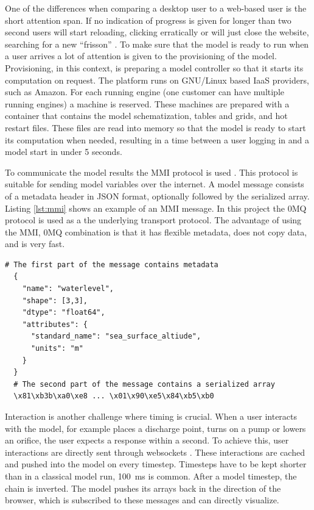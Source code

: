 \documentclass[a4paper]{article}
\begin{document}
One of the differences when comparing a desktop user to a web-based user is the short attention span. If no indication of progress is given for longer than two second users will start reloading, clicking erratically or will just close the website, searching for a new ``frisson'' \citep{Carr2011}. To make sure that the model is ready to run when a user arrives a lot of attention is given to the provisioning of the model. Provisioning, in this context, is preparing a model controller so that it starts its computation on request. The platform runs on GNU/Linux based \ac{IaaS} providers, such as Amazon. For each running engine (one customer can have multiple running engines) a machine is reserved. These machines are prepared with a container that contains the model schematization, tables and grids, and hot restart files. These files are read into memory so that the model is ready to start its computation when needed, resulting in a time between a user logging in and a model start in under 5 seconds.

To communicate the model results the \ac{MMI} protocol is used \citep{Baart2014a}. This protocol is suitable for sending model variables over the internet. A model message consists of a metadata header in \ac{JSON} format, optionally followed by the serialized array. Listing \ref{lst:mmi} shows an example of an \ac{MMI} message. In this project the \ac{0MQ} protocol is used as a the underlying transport protocol. The advantage of using the \ac{MMI}, \ac{0MQ} combination is that it has flexible metadata, does not copy data, and is very fast.

\begin{lstlisting}[caption=MMI message,label=lst:mmi]
  # The first part of the message contains metadata
  {
    "name": "waterlevel",
    "shape": [3,3],
    "dtype": "float64",
    "attributes": {
      "standard_name": "sea_surface_altiude",
      "units": "m"
    }
  }
  # The second part of the message contains a serialized array
  \x81\xb3b\xa0\xe8 ... \x01\x90\xe5\x84\xb5\xb0
\end{lstlisting}

Interaction is another challenge where timing is crucial. When a user interacts with the model, for example places a discharge point, turns on a pump or lowers an orifice, the user expects a response within a second. To achieve this, user interactions are directly sent through websockets \citep{Hickson2012}. These interactions are cached and pushed into the model on every timestep. Timesteps have to be kept shorter than in a classical model run, \SI{100}{\milli\second} is common. After a model timestep, the chain is inverted. The model pushes its arrays back in the direction of the browser, which is subscribed to these messages and can directly visualize.
\end{document}

